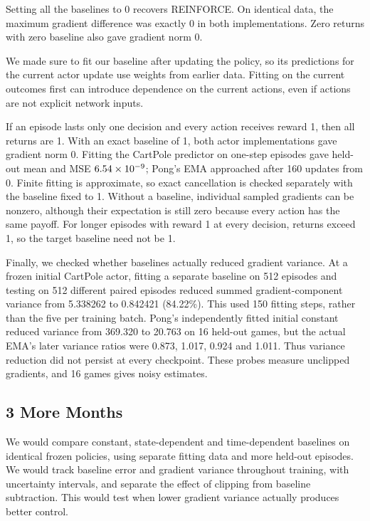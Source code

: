 \documentclass{article}
\begin{document}
Setting all the baselines to 0 recovers REINFORCE. On identical data, the maximum gradient difference was exactly 0 in both implementations. Zero returns with zero baseline also gave gradient norm 0.

We made sure to fit our baseline after updating the policy, so its predictions for the current actor update use weights from earlier data. Fitting on the current outcomes first can introduce dependence on the current actions, even if actions are not explicit network inputs.

If an episode lasts only one decision and every action receives reward 1, then all returns are 1. With an exact baseline of 1, both actor implementations gave gradient norm 0. Fitting the CartPole predictor on one-step episodes gave held-out mean \OneFitMean{} and MSE $6.54\times10^{-9}$; Pong's EMA approached \OneEMA{} after 160 updates from 0. Finite fitting is approximate, so exact cancellation is checked separately with the baseline fixed to 1. Without a baseline, individual sampled gradients can be nonzero, although their expectation is still zero because every action has the same payoff. For longer episodes with reward 1 at every decision, returns exceed 1, so the target baseline need not be 1.

Finally, we checked whether baselines actually reduced gradient variance. At a frozen initial CartPole actor, fitting a separate baseline on 512 episodes and testing on 512 different paired episodes reduced summed gradient-component variance from 5.338262 to 0.842421 (84.22\%). This used 150 fitting steps, rather than the five per training batch. Pong's independently fitted initial constant reduced variance from 369.320 to 20.763 on 16 held-out games, but the actual EMA's later variance ratios were 0.873, 1.017, 0.924 and 1.011. Thus variance reduction did not persist at every checkpoint. These probes measure unclipped gradients, and 16 games gives noisy estimates.

\subsection{3 More Months}
We would compare constant, state-dependent and time-dependent baselines on identical frozen policies, using separate fitting data and more held-out episodes. We would track baseline error and gradient variance throughout training, with uncertainty intervals, and separate the effect of clipping from baseline subtraction. This would test when lower gradient variance actually produces better control.
\end{document}
